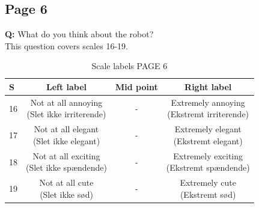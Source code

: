 \subsection{Page 6}
\noindent
\textbf{Q:} What do you think about the robot?\\%
This question covers scales 16-19. 
%
\begin{table}[H]
	\centering
\caption{Scale labels PAGE 6}
	\label{tab:ScalesPage6} 
	\begin{tabular}{l|c|c|c}
		S     & Left label & Mid point & Right label \\\hline
		16   & \makecell{Not at all annoying\\(Slet ikke irriterende)}  & - & \makecell{Extremely annoying \\(Ekstremt irriterende)}        \\\hline
		17   & \makecell{Not at all elegant \\(Slet ikke elegant)} & - & \makecell{Extremely elegant \\(Ekstremt elegant)}         \\\hline
		18   & \makecell{Not at all exciting\\(Slet ikke spændende)} & - & \makecell{Extremely exciting \\(Ekstremt spændende)}         \\\hline
	 	19   & \makecell{Not at all cute\\(Slet ikke sød)} & - & \makecell{Extremely cute \\(Ekstremt sød)}               
	\end{tabular}        
\end{table}
\noindent
%
